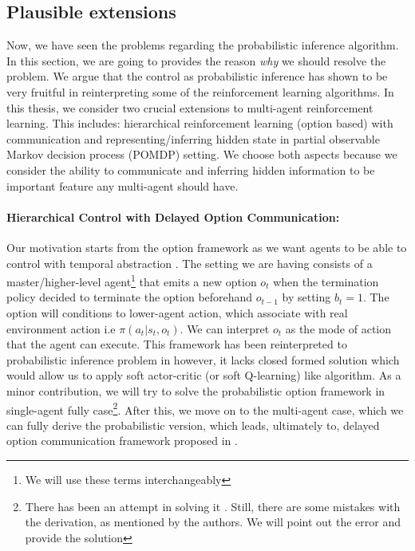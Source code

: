 \subsection{Plausible extensions}
\label{sec:chap1-MEMARL-Extensions}
Now, we have seen the problems regarding the probabilistic inference algorithm. In this section, we are going to provides the reason \textit{why} we should resolve the problem. We argue that the control as probabilistic inference has shown to be very fruitful in reinterpreting some of the reinforcement learning algorithms. In this thesis, we consider two crucial extensions to multi-agent reinforcement learning. This includes: hierarchical reinforcement learning (option based) with communication and representing/inferring hidden state in partial observable Markov decision process (POMDP) setting. We choose both aspects because we consider the ability to communicate and inferring hidden information to be important feature any multi-agent should have. 

\paragraph{Hierarchical Control with Delayed Option Communication:} 
Our motivation starts from the option framework as we want agents to be able to control with temporal abstraction \cite{sutton1999between, bacon2017option}. The setting we are having consists of a master/higher-level agent\footnote{We will use these terms interchangeably} that emits a new option $o_t$ when the termination policy decided to terminate the option beforehand $o_{t-1}$ by setting $b_t = 1$. The option will conditions to lower-agent action, which associate with real environment action i.e $\pi(a_t | s_t, o_t)$. We can interpret $o_t$ as the mode of action that the agent can execute. This framework has been reinterpreted to probabilistic inference problem in \cite{igl2019multitask} however, it lacks closed formed solution which would allow us to apply soft actor-critic (or soft Q-learning) like algorithm. As a minor contribution, we will try to solve the probabilistic option framework in single-agent fully case\footnote{There has been an attempt in solving it \cite{lobo2019soft}. Still, there are some mistakes with the derivation, as mentioned by the authors. We will point out the error and provide the solution}. After this, we move on to the multi-agent case, which we can fully derive the probabilistic version, which leads, ultimately to, delayed option communication framework proposed in \cite{han2019multi}. 


